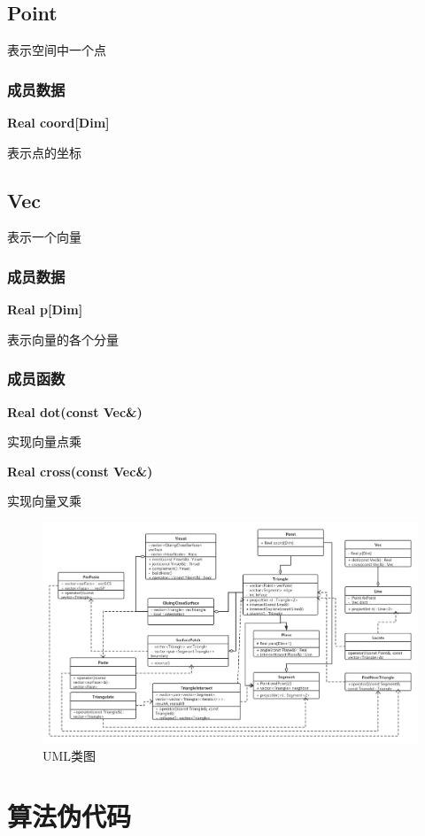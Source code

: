 \documentclass[a4paper]{book}
\numberwithin{equation}{chapter}
\theoremstyle{definition}
\begin{document}
\section{Point}
表示空间中一个点


\subsection{成员数据}
\textbf{Real coord[Dim]}

表示点的坐标


\section{Vec}
表示一个向量


\subsection{成员数据}
\textbf{Real p[Dim]}

表示向量的各个分量



\subsection{成员函数}
\textbf{Real dot(const Vec\&) }

实现向量点乘

\textbf{Real cross(const Vec\&) }

实现向量叉乘	
\begin{figure}
	\caption{UML类图}
	\includegraphics[width = 18cm]{fig/Boolean3D.png}
\end{figure}


\chapter{算法伪代码}
\end{document}

